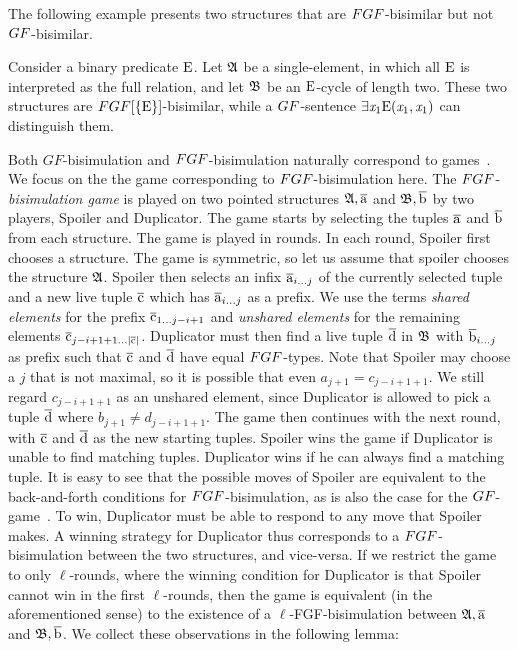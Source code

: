 The following example presents two structures that are $\FGF$-bisimilar but not $\GF$-bisimilar.
\begin{example} 
Consider a binary predicate $\mathrm{E}$.
Let ${\mathfrak{A}}$ be a single-element, in which all $\mathrm{E}$ is interpreted as the full relation, and let ${\mathfrak{B}}$ be an $\mathrm{E}$-cycle of length two. These two structures are $\FGF[\{\relE\}]$-bisimilar, while a $\GF$-sentence $\exists{\mathit{x}_1}\mathrm{E}(\mathit{x}_1,\mathit{x}_1)$ can distinguish them.
\end{example}

Both $GF$-bisimulation and $\FGF$-bisimulation naturally correspond to games~\cite[Sec. 1.2.1]{Gradel014}.
We focus on the the game corresponding to $\FGF$-bisimulation here.
The $\FGF$-\emph{bisimulation game} is played on two pointed structures ${\mathfrak{A}}, \overline{\mathrm{a}}$ and ${\mathfrak{B}}, \overline{\mathrm{b}}$ by two players, Spoiler and Duplicator.
The game starts by selecting the tuples $\overline{\mathrm{a}}$ and $\overline{\mathrm{b}}$ from each structure.
The game is played in rounds.
In each round, Spoiler first chooses a structure.
The game is symmetric, so let us assume that spoiler chooses the structure ${\mathfrak{A}}$.
Spoiler then selects an infix $\overline{\mathrm{a}}_{i\ldots j}$ of the currently selected tuple and a new live tuple $\overline{\mathrm{c}}$ which has $\overline{\mathrm{a}}_{i\ldots j}$ as a prefix.
We use the terms \emph{shared elements} for the prefix $\overline{\mathrm{c}}_{1\ldots j-i+1}$ and \emph{unshared elements} for the remaining elements $\overline{\mathrm{c}}_{j-i+1+1\ldots|\overline{\mathrm{c}}|}$.
Duplicator must then find a live tuple $\overline{\mathrm{d}}$ in ${\mathfrak{B}}$ with $\overline{\mathrm{b}}_{i\ldots j}$ as prefix such that $\overline{\mathrm{c}}$ and $\overline{\mathrm{d}}$ have equal $\FGF$-types.
Note that Spoiler may choose a $j$ that is not maximal, so it is possible that even $a_{j+1} = c_{j-i+1+1}$.
We still regard $c_{j-i+1+1}$ as an unshared element, since Duplicator is allowed to pick a tuple $\overline{\mathrm{d}}$ where $b_{j+1} \neq d_{j-i+1+1}$.
The game then continues with the next round, with $\overline{\mathrm{c}}$ and $\overline{\mathrm{d}}$ as the new starting tuples.
Spoiler wins the game if Duplicator is unable to find matching tuples.
Duplicator wins if he can always find a matching tuple.
It is easy to see that the possible moves of Spoiler are equivalent to the back-and-forth conditions for $\FGF$-bisimulation, as is also the case for the $\GF$-game~\cite[Sec.\ 3.2]{Gradel014}.
To win, Duplicator must be able to respond to any move that Spoiler makes.
A winning strategy for Duplicator thus corresponds to a $\FGF$-bisimulation between the two structures, and vice-versa.
If we restrict the game to only $\ell$-rounds, where the winning condition for Duplicator is that Spoiler cannot win in the first $\ell$-rounds, then the game is equivalent (in the aforementioned sense) to the existence of a $\ell$-FGF-bisimulation between ${\mathfrak{A}}, \overline{\mathrm{a}}$ and ${\mathfrak{B}}, \overline{\mathrm{b}}$.
We collect these observations in the following lemma:

